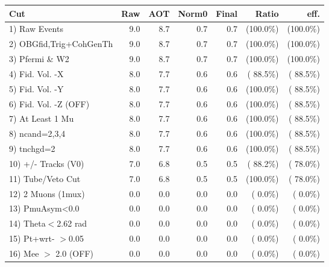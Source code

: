  \begin{table}[h!]\centering
 \begin{tabular}{||l||r|r|r|r|r|r||}
 \hline
 \hline
 Cut & Raw & AOT & Norm0 & Final & Ratio & eff.       \\
 \hline
  1) Raw Events           &          9.0 &          8.7 &          0.7 &          0.7 & (100.0\%) & (100.0\%) \\
  2) OBGfid,Trig+CohGenTh &          9.0 &          8.7 &          0.7 &          0.7 & (100.0\%) & (100.0\%) \\
  3) Pfermi \& W2         &          9.0 &          8.7 &          0.7 &          0.7 & (100.0\%) & (100.0\%) \\
  4) Fid. Vol. -X         &          8.0 &          7.7 &          0.6 &          0.6 & ( 88.5\%) & ( 88.5\%) \\
  5) Fid. Vol. -Y         &          8.0 &          7.7 &          0.6 &          0.6 & (100.0\%) & ( 88.5\%) \\
  6) Fid. Vol. -Z (OFF)   &          8.0 &          7.7 &          0.6 &          0.6 & (100.0\%) & ( 88.5\%) \\
  7) At Least 1 Mu        &          8.0 &          7.7 &          0.6 &          0.6 & (100.0\%) & ( 88.5\%) \\
  8) ncand=2,3,4          &          8.0 &          7.7 &          0.6 &          0.6 & (100.0\%) & ( 88.5\%) \\
  9) tnchgd=2             &          8.0 &          7.7 &          0.6 &          0.6 & (100.0\%) & ( 88.5\%) \\
 10) +/- Tracks (V0)      &          7.0 &          6.8 &          0.5 &          0.5 & ( 88.2\%) & ( 78.0\%) \\
 11) Tube/Veto Cut        &          7.0 &          6.8 &          0.5 &          0.5 & (100.0\%) & ( 78.0\%) \\
 12) 2 Muons (1mux)       &          0.0 &          0.0 &          0.0 &          0.0 & (  0.0\%) & (  0.0\%) \\
 13) PmuAsym<0.0          &          0.0 &          0.0 &          0.0 &          0.0 & (  0.0\%) & (  0.0\%) \\
 14) Theta$<$2.62 rad     &          0.0 &          0.0 &          0.0 &          0.0 & (  0.0\%) & (  0.0\%) \\
 15) Pt+wrt- $>$0.05      &          0.0 &          0.0 &          0.0 &          0.0 & (  0.0\%) & (  0.0\%) \\
 16) Mee $>$ 2.0  (OFF)   &          0.0 &          0.0 &          0.0 &          0.0 & (  0.0\%) & (  0.0\%) \\

\end{tabular}
\end{table}
